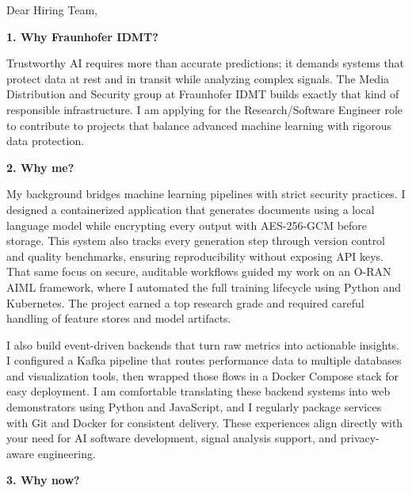 \documentclass[11pt,a4paper]{coverletter}
\begin{document}

\opening{Dear Hiring Team,}

\vspace{8pt}\noindent\textbf{1. Why Fraunhofer IDMT?}\par\vspace{3pt}

Trustworthy AI requires more than accurate predictions; it demands systems that protect data at rest and in transit while analyzing complex signals. The Media Distribution and Security group at Fraunhofer IDMT builds exactly that kind of responsible infrastructure. I am applying for the Research/Software Engineer role to contribute to projects that balance advanced machine learning with rigorous data protection.

\vspace{8pt}\noindent\textbf{2. Why me?}\par\vspace{3pt}

My background bridges machine learning pipelines with strict security practices. I designed a containerized application that generates documents using a local language model while encrypting every output with AES-256-GCM before storage. This system also tracks every generation step through version control and quality benchmarks, ensuring reproducibility without exposing API keys. That same focus on secure, auditable workflows guided my work on an O-RAN AIML framework, where I automated the full training lifecycle using Python and Kubernetes. The project earned a top research grade and required careful handling of feature stores and model artifacts.

I also build event-driven backends that turn raw metrics into actionable insights. I configured a Kafka pipeline that routes performance data to multiple databases and visualization tools, then wrapped those flows in a Docker Compose stack for easy deployment. I am comfortable translating these backend systems into web demonstrators using Python and JavaScript, and I regularly package services with Git and Docker for consistent delivery. These experiences align directly with your need for AI software development, signal analysis support, and privacy-aware engineering.

\vspace{8pt}\noindent\textbf{3. Why now?}\par\vspace{3pt}
\end{document}
